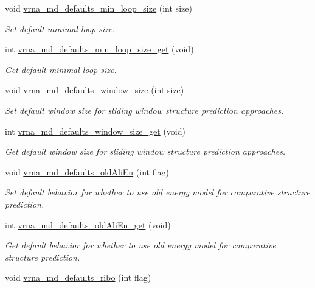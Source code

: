 \begin{DoxyCompactItemize}
void \hyperlink{group__model__details_gac152f1e78c1058a10261022c8dfda0f7}{vrna\+\_\+md\+\_\+defaults\+\_\+min\+\_\+loop\+\_\+size} (int size)
\begin{DoxyCompactList}\small\item\em Set default minimal loop size. \end{DoxyCompactList}\item 
int \hyperlink{group__model__details_ga5cc691174a75c652807dc361b617632a}{vrna\+\_\+md\+\_\+defaults\+\_\+min\+\_\+loop\+\_\+size\+\_\+get} (void)
\begin{DoxyCompactList}\small\item\em Get default minimal loop size. \end{DoxyCompactList}\item 
void \hyperlink{group__model__details_ga7b802ce0e8c3181bf5cb580de6d5b26a}{vrna\+\_\+md\+\_\+defaults\+\_\+window\+\_\+size} (int size)
\begin{DoxyCompactList}\small\item\em Set default window size for sliding window structure prediction approaches. \end{DoxyCompactList}\item 
int \hyperlink{group__model__details_ga670146a9aa3ba77f4d422d60b7c30ac9}{vrna\+\_\+md\+\_\+defaults\+\_\+window\+\_\+size\+\_\+get} (void)
\begin{DoxyCompactList}\small\item\em Get default window size for sliding window structure prediction approaches. \end{DoxyCompactList}\item 
void \hyperlink{group__model__details_ga41521d5b9fb7e0f31e7ea73f5792afab}{vrna\+\_\+md\+\_\+defaults\+\_\+old\+Ali\+En} (int flag)
\begin{DoxyCompactList}\small\item\em Set default behavior for whether to use old energy model for comparative structure prediction. \end{DoxyCompactList}\item 
int \hyperlink{group__model__details_ga2374492b5019df88022fe4c05f0f3630}{vrna\+\_\+md\+\_\+defaults\+\_\+old\+Ali\+En\+\_\+get} (void)
\begin{DoxyCompactList}\small\item\em Get default behavior for whether to use old energy model for comparative structure prediction. \end{DoxyCompactList}\item 
void \hyperlink{group__model__details_ga937c45e1d06fd6168730a9b08d130be3}{vrna\+\_\+md\+\_\+defaults\+\_\+ribo} (int flag)

\end{DoxyCompactItemize}
